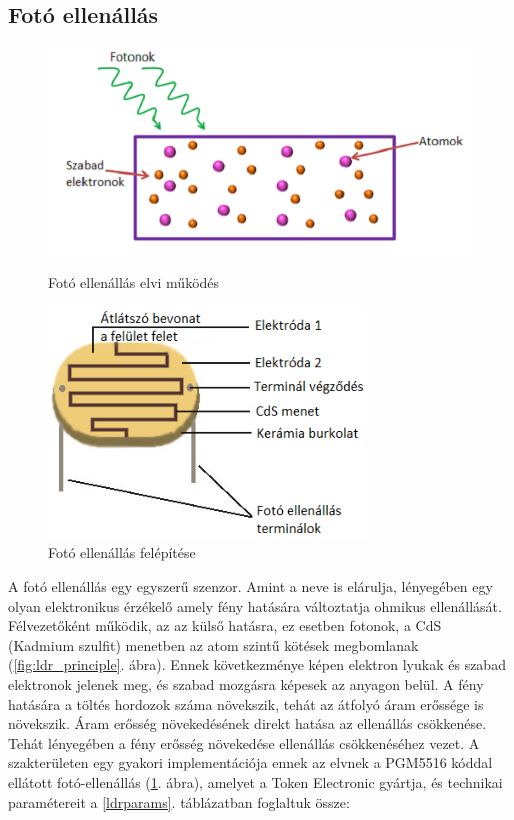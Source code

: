 \documentclass[a4paper,12pt]{article}
\begin{document}
\subsection{Fotó ellenállás}

\begin{figure}[htp]
    \centering
    \begin{minipage}{0.45\textwidth}
        \centering
        \includegraphics[width=\textwidth]{images/ldr_principle.png}
        \caption[LDR elv]{Fotó ellenállás elvi működés}
		\label{fig:ldr_principle}
    \end{minipage}\hfill
    \begin{minipage}{0.45\textwidth}
        \centering
        \includegraphics[width=0.75\textwidth]{images/ldr_structure.png}
        \caption[LDR struktúra]{Fotó ellenállás felépítése}
		\label{fig:ldr_structure}
    \end{minipage}
\end{figure}

A fotó ellenállás egy egyszerű szenzor. 
Amint a neve is elárulja, lényegében egy olyan elektronikus érzékelő amely fény hatására változtatja ohmikus ellenállását.
Félvezetőként működik, az az külső hatásra, ez esetben fotonok, a CdS (Kadmium szulfit) menetben az atom szintű kötések megbomlanak (\ref{fig:ldr_principle}. ábra).
Ennek következménye képen elektron lyukak és szabad elektronok jelenek meg, és szabad mozgásra képesek az anyagon belül.
A fény hatására a töltés hordozok száma növekszik, tehát az átfolyó áram erőssége is növekszik. 
Áram erősség növekedésének direkt hatása az ellenállás csökkenése. Tehát lényegében a fény erősség növekedése ellenállás csökkenéséhez vezet.
A szakterületen egy gyakori implementációja ennek az elvnek a PGM5516 kóddal ellátott fotó-ellenállás (\ref{fig:ldr_structure}. ábra), amelyet a Token Electronic \cite{toel19} gyártja, és technikai paramétereit a \ref{ldrparams}. táblázatban foglaltuk össze:
\end{document}

